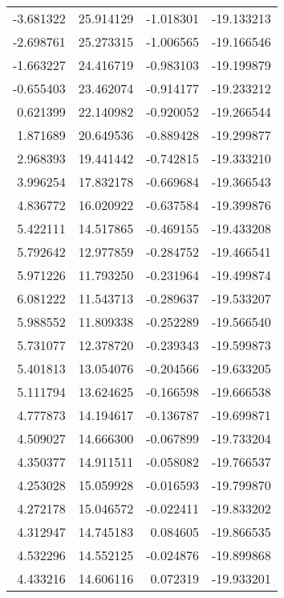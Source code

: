 \begin{tabular}{rrrr}
       -3.681322 &        25.914129 &   -1.018301 & -19.133213 \\
       -2.698761 &        25.273315 &   -1.006565 & -19.166546 \\
       -1.663227 &        24.416719 &   -0.983103 & -19.199879 \\
       -0.655403 &        23.462074 &   -0.914177 & -19.233212 \\
        0.621399 &        22.140982 &   -0.920052 & -19.266544 \\
        1.871689 &        20.649536 &   -0.889428 & -19.299877 \\
        2.968393 &        19.441442 &   -0.742815 & -19.333210 \\
        3.996254 &        17.832178 &   -0.669684 & -19.366543 \\
        4.836772 &        16.020922 &   -0.637584 & -19.399876 \\
        5.422111 &        14.517865 &   -0.469155 & -19.433208 \\
        5.792642 &        12.977859 &   -0.284752 & -19.466541 \\
        5.971226 &        11.793250 &   -0.231964 & -19.499874 \\
        6.081222 &        11.543713 &   -0.289637 & -19.533207 \\
        5.988552 &        11.809338 &   -0.252289 & -19.566540 \\
        5.731077 &        12.378720 &   -0.239343 & -19.599873 \\
        5.401813 &        13.054076 &   -0.204566 & -19.633205 \\
        5.111794 &        13.624625 &   -0.166598 & -19.666538 \\
        4.777873 &        14.194617 &   -0.136787 & -19.699871 \\
        4.509027 &        14.666300 &   -0.067899 & -19.733204 \\
        4.350377 &        14.911511 &   -0.058082 & -19.766537 \\
        4.253028 &        15.059928 &   -0.016593 & -19.799870 \\
        4.272178 &        15.046572 &   -0.022411 & -19.833202 \\
        4.312947 &        14.745183 &    0.084605 & -19.866535 \\
        4.532296 &        14.552125 &   -0.024876 & -19.899868 \\
        4.433216 &        14.606116 &    0.072319 & -19.933201 \\

\end{tabular}

